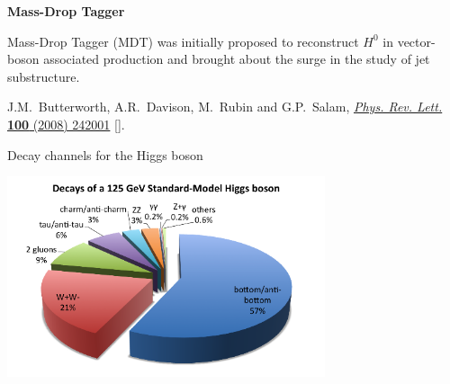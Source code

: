 \documentclass[9pt,a4paper,unknownkeysallowed,xcolor=dvipsnames,aspectratio=43]{beamer}
\begin{document}
\begin{frame}{\bf\huge Mass-Drop Tagger}\vspace{2mm}

{\color{darkred}{\Large$\bullet$} Mass-Drop Tagger (MDT)} was initially proposed to reconstruct $H^0$ in vector-boson associated production and brought about the surge in the  study of jet substructure.\\

\begin{center}
    {\tiny \color{teablue} J.M.~Butterworth, A.R.~Davison, M.~Rubin and G.P.~Salam, %
  \href{https://doi.org/10.1103/PhysRevLett.100.242001}{\emph{Phys. Rev. Lett.}
  {\bfseries 100} (2008) 242001}
  [\href{https://arxiv.org/abs/0802.2470}{{}}].}
\end{center}\vspace{2mm}

{\color{darkred}{\Large$\bullet$}}
Decay channels for the Higgs boson 
\vspace{2mm}
\begin{center}
    \includegraphics[width=0.7\textwidth]{05/higgs_decay.png}
\end{center}
\end{frame}
%
%
\end{document}
